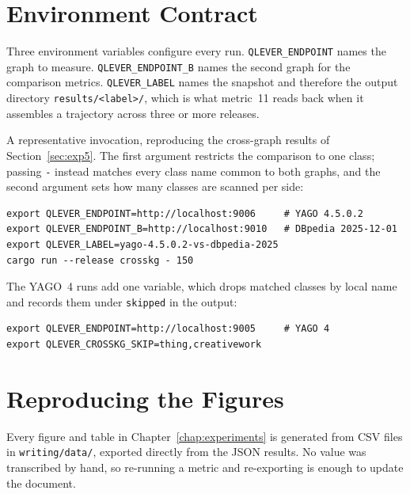\section{Environment Contract}
\label{sec:appendix_env}

Three environment variables configure every run.
\texttt{QLEVER\_ENDPOINT} names the graph to measure.
\texttt{QLEVER\_ENDPOINT\_B} names the second graph for the comparison metrics.
\texttt{QLEVER\_LABEL} names the snapshot and therefore the output directory
\texttt{results/<label>/}, which is what metric~11 reads back when it assembles a
trajectory across three or more releases.

A representative invocation, reproducing the cross-graph results of
Section~\ref{sec:exp5}. The first argument restricts the comparison to one
class; passing \texttt{-} instead matches every class name common to both
graphs, and the second argument sets how many classes are scanned per side:

\begin{verbatim}
export QLEVER_ENDPOINT=http://localhost:9006     # YAGO 4.5.0.2
export QLEVER_ENDPOINT_B=http://localhost:9010   # DBpedia 2025-12-01
export QLEVER_LABEL=yago-4.5.0.2-vs-dbpedia-2025
cargo run --release crosskg - 150
\end{verbatim}

The YAGO~4 runs add one variable, which drops matched classes by local name and
records them under \texttt{skipped} in the output:

\begin{verbatim}
export QLEVER_ENDPOINT=http://localhost:9005     # YAGO 4
export QLEVER_CROSSKG_SKIP=thing,creativework
\end{verbatim}

\section{Reproducing the Figures}
\label{sec:appendix_figures}

Every figure and table in Chapter~\ref{chap:experiments} is generated from CSV
files in \texttt{writing/data/}, exported directly from the JSON results. No
value was transcribed by hand, so re-running a metric and re-exporting is enough
to update the document.
